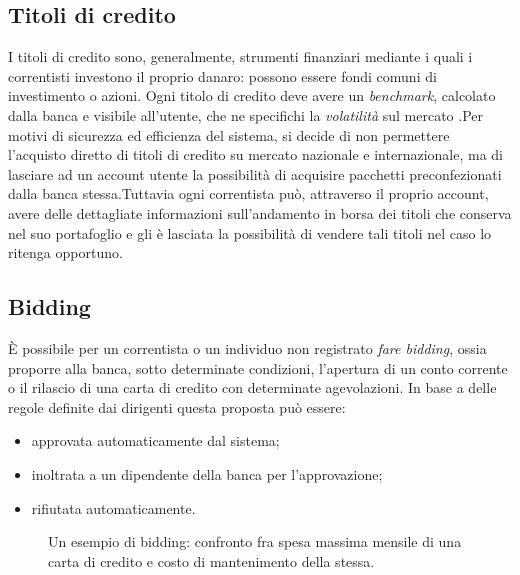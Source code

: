 \subsection{Titoli di credito}

I titoli di credito sono, generalmente, strumenti finanziari mediante i quali i correntisti investono il proprio danaro: possono essere fondi comuni di investimento o azioni.
Ogni titolo di credito deve avere un \emph{benchmark}, calcolato dalla banca e visibile all'utente, che ne specifichi la \emph{volatilità} sul mercato .Per motivi di sicurezza ed efficienza del sistema, si decide di non permettere l'acquisto diretto di titoli di credito su mercato nazionale e internazionale, ma di lasciare ad un account utente la possibilità di acquisire pacchetti preconfezionati dalla banca stessa.Tuttavia ogni correntista può, attraverso il proprio account, avere delle dettagliate informazioni sull'andamento in borsa dei titoli che conserva nel suo portafoglio  e gli è lasciata la possibilità di vendere tali titoli nel caso lo ritenga opportuno.

\subsection{Bidding}

\`E possibile per un correntista o un individuo non registrato \emph{fare bidding}, ossia proporre alla banca, sotto determinate condizioni, l'apertura di un conto corrente o il rilascio di una carta di credito con determinate agevolazioni.
In base a delle regole definite dai dirigenti questa proposta pu\`o essere:
\begin{itemize}
	\item approvata automaticamente dal sistema;
	\item inoltrata a un dipendente della banca per l'approvazione;
	\item rifiutata automaticamente.
\end{itemize}

\begin{figure}
	\caption{Un esempio di bidding: confronto fra spesa massima mensile di una carta di credito e costo di mantenimento della stessa.}
\end{figure}


